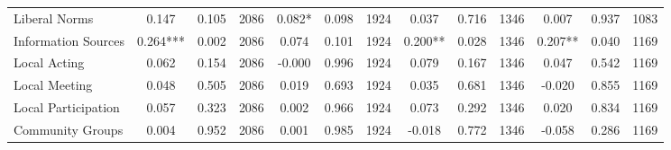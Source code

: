 \begin{tabular}{l*{12}{c}}
 Liberal Norms &        0.147 &        0.105 & 2086    &        0.082* &        0.098 & 1924    &        0.037 &        0.716 & 1346 &        0.007 &        0.937 & 1083 \\ 

 Information Sources &        0.264*** &        0.002 & 2086    &        0.074 &        0.101 & 1924    &        0.200** &        0.028 & 1346 &        0.207** &        0.040 & 1169 \\ 

 Local Acting &        0.062 &        0.154 & 2086    &       -0.000 &        0.996 & 1924    &        0.079 &        0.167 & 1346 &        0.047 &        0.542 & 1169 \\ 

 Local Meeting &        0.048 &        0.505 & 2086    &        0.019 &        0.693 & 1924    &        0.035 &        0.681 & 1346 &       -0.020 &        0.855 & 1169 \\ 

 Local Participation &        0.057 &        0.323 & 2086    &        0.002 &        0.966 & 1924    &        0.073 &        0.292 & 1346 &        0.020 &        0.834 & 1169 \\ 

 Community Groups &        0.004 &        0.952 & 2086    &        0.001 &        0.985 & 1924    &       -0.018 &        0.772 & 1346 &       -0.058 &        0.286 & 1169 \\ 

\hline \end{tabular}
